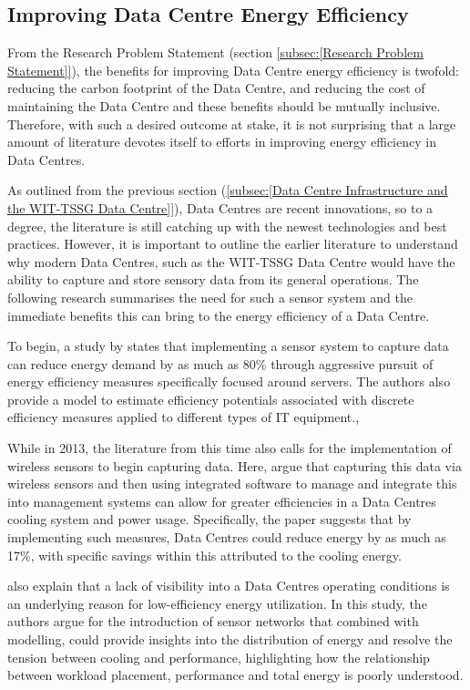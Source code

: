 \documentclass[12pt]{scrartcl}
\begin{document}
\subsection{Improving Data Centre Energy Efficiency}
\label{subsec:[Improving Data Centre Energy Efficiency]}

From the Research Problem Statement (section \ref{subsec:[Research Problem Statement]}), the benefits for improving Data Centre energy efficiency is twofold: reducing the carbon footprint of the Data Centre, and reducing the cost of maintaining the Data Centre and these benefits should be mutually inclusive. Therefore, with such a desired outcome at stake, it is not surprising that a large amount of literature devotes itself to efforts in improving energy efficiency in Data Centres.

As outlined from the previous section (\ref{subsec:[Data Centre Infrastructure and the WIT-TSSG Data Centre]}), Data Centres are recent innovations, so to a degree, the literature is still catching up with the newest technologies and best practices. However, it is important to outline the earlier literature to understand why modern Data Centres, such as the WIT-TSSG Data Centre would have the ability to capture and store sensory data from its general operations. The following research summarises the need for such a sensor system and the immediate benefits this can bring to the energy efficiency of a Data Centre.   

To begin, a study by \citet{edsbas.A50BA51A20120101} states that implementing a sensor system to capture data can reduce energy demand by as much as 80\% through aggressive pursuit of energy efficiency measures specifically focused around servers. The authors also provide a model to estimate efficiency potentials associated with discrete efficiency measures applied to different types of IT equipment., 

While in 2013, the literature from this time also calls for the implementation of wireless sensors to begin capturing data. Here, \citet{edssch.qt9c84f49g20130101} argue that capturing this data via wireless sensors and then using integrated software to manage and integrate this into management systems can allow for greater efficiencies in a Data Centres cooling system and power usage. Specifically, the paper suggests that by implementing such measures, Data Centres could reduce energy by as much as 17\%, with specific savings within this attributed to the cooling energy.

\citet{edsjsr.4134817120120101} also explain that a lack of visibility into a Data Centres operating conditions is an underlying reason for low-efficiency energy utilization. In this study, the authors argue for the introduction of sensor networks that combined with modelling, could provide insights into the distribution of energy and resolve the tension between cooling and performance, highlighting how the relationship between workload placement, performance and total energy is poorly understood.    
\end{document}
